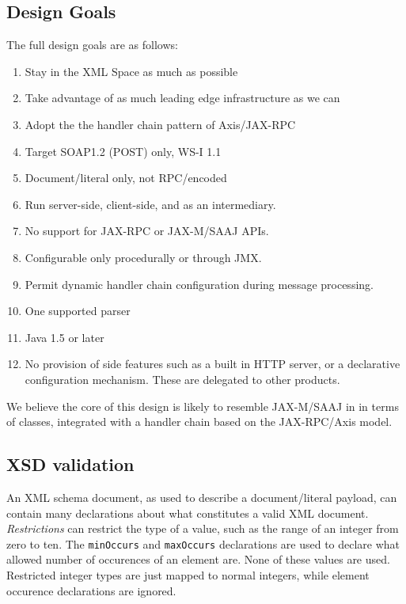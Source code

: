 \subsection{Design Goals}
\label{alpine:design}

The full design goals are as follows:

\begin{enumerate}

\item Stay in the XML Space as much as possible
\item Take advantage of as much leading edge infrastructure as we can
\item Adopt the the handler chain pattern of Axis/JAX-RPC
\item Target SOAP1.2 (POST) only, WS-I 1.1
\item Document/literal only, not RPC/encoded
\item Run server-side, client-side, and as an intermediary. 
\item No support for JAX-RPC or JAX-M/SAAJ APIs.
\item Configurable only procedurally or through JMX.
\item Permit dynamic handler chain configuration during message processing.
\item One supported parser %
\item Java 1.5 or later 

\item No provision of side features such as a built in HTTP server, or
a declarative configuration mechanism. These are delegated to other products.
\end{enumerate}

We believe the core of this design is likely to resemble JAX-M/SAAJ in
in terms of classes, integrated with a handler chain based on the
JAX-RPC/Axis model.

\subsection{XSD validation}
\label{alpine:validation}
An XML schema document, as used to describe a document/literal
payload, can contain many declarations about what constitutes a valid
XML document. \emph{Restrictions} can restrict the type of a value,
such as the range of an integer from zero to ten. The \verb|minOccurs|
and \verb|maxOccurs| declarations are used to declare what allowed
number of occurences of an element are. None of these values are
used. Restricted integer types are just mapped to normal integers,
while element occurence declarations are ignored.

